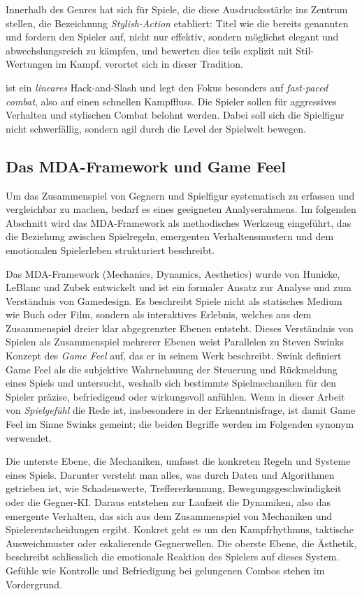 \documentclass[../Main.tex]{subfiles}
\begin{document}
Innerhalb des Genres hat sich für Spiele, die diese Ausdrucksstärke ins Zentrum stellen, die Bezeichnung \textit{Stylish-Action} etabliert: Titel wie die bereits genannten  und  fordern den Spieler auf, nicht nur effektiv, sondern möglichst elegant und abwechslungsreich zu kämpfen, und bewerten dies teils explizit mit Stil-Wertungen im Kampf.  verortet sich in dieser Tradition.

 ist ein \textit{lineares} Hack-and-Slash und legt den Fokus besonders auf \textit{fast-paced combat}, also auf einen schnellen Kampffluss. Die Spieler sollen für aggressives Verhalten und stylischen Combat belohnt werden. Dabei soll sich die Spielfigur nicht schwerfällig, sondern agil durch die Level der Spielwelt bewegen.

\subsection{Das MDA-Framework und Game Feel}
Um das Zusammenspiel von Gegnern und Spielfigur systematisch zu erfassen und vergleichbar zu machen, bedarf es eines geeigneten Analyserahmens. Im folgenden Abschnitt wird das MDA-Framework als methodisches Werkzeug eingeführt, das die Beziehung zwischen Spielregeln, emergenten Verhaltensmustern und dem emotionalen Spielerleben strukturiert beschreibt.

Das MDA-Framework (Mechanics, Dynamics, Aesthetics) wurde von Hunicke, LeBlanc und Zubek entwickelt und ist ein formaler Ansatz zur Analyse und zum Verständnis von Gamedesign. Es beschreibt Spiele nicht als statisches Medium wie Buch oder Film, sondern als interaktives Erlebnis, welches aus dem Zusammenspiel dreier klar abgegrenzter Ebenen entsteht. Dieses Verständnis von Spielen als Zusammenspiel mehrerer Ebenen weist Parallelen zu Steven Swinks Konzept des \textit{Game Feel} auf, das er in seinem Werk  beschreibt. Swink definiert Game Feel als die subjektive Wahrnehmung der Steuerung und Rückmeldung eines Spiels und untersucht, weshalb sich bestimmte Spielmechaniken für den Spieler präzise, befriedigend oder wirkungsvoll anfühlen.\autocite[s.1-s.6]{swink2008gamefeel} Wenn in dieser Arbeit von \textit{Spielgefühl} die Rede ist, insbesondere in der Erkenntnisfrage, ist damit Game Feel im Sinne Swinks gemeint; die beiden Begriffe werden im Folgenden synonym verwendet.

Die unterste Ebene, die Mechaniken, umfasst die konkreten Regeln und Systeme eines Spiels. Darunter versteht man alles, was durch Daten und Algorithmen getrieben ist, wie Schadenswerte, Treffererkennung, Bewegungsgeschwindigkeit oder die Gegner-KI. Daraus entstehen zur Laufzeit die Dynamiken, also das emergente Verhalten, das sich aus dem Zusammenspiel von Mechaniken und Spielerentscheidungen ergibt. Konkret geht es um den Kampfrhythmus, taktische Ausweichmuster oder eskalierende Gegnerwellen. Die oberste Ebene, die Ästhetik, beschreibt schliesslich die emotionale Reaktion des Spielers auf dieses System. Gefühle wie Kontrolle und Befriedigung bei gelungenen Combos stehen im Vordergrund.
\end{document}
